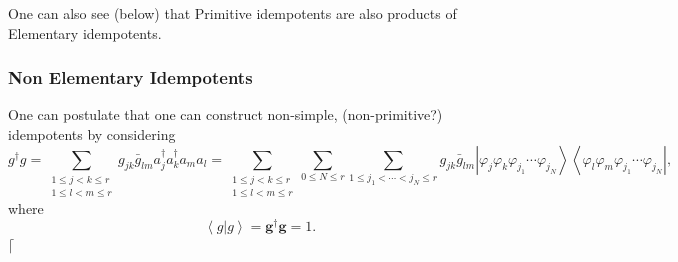 \documentclass[aps,preprint]{revtex4}%
\begin{document}
One can also see (below) that Primitive idempotents are also products of
Elementary idempotents.

\subsubsection{Non Elementary Idempotents }

One can postulate that one can construct non-simple, (non-primitive?)
idempotents by considering
\begin{equation}
g^{\dagger}g=\sum_{\substack{1\leq j<k\leq r\\1\leq l<m\leq r}}g_{jk}\bar
{g}_{lm}a_{j}^{\dagger}a_{k}^{\dagger}a_{m}a_{l}=\sum_{\substack{1\leq j<k\leq
r\\1\leq l<m\leq r}}\sum_{0\leq N\leq r}\sum_{1\leq j_{1}<\cdots<j_{N}\leq
r}g_{jk}\bar{g}_{lm}\left\vert \varphi_{j}\varphi_{k}\varphi_{j_{1}}%
\cdots\varphi_{j_{N}}\right\rangle \left\langle \varphi_{l}\varphi_{m}%
\varphi_{j_{1}}\cdots\varphi_{j_{N}}\right\vert ,
\end{equation}
where
\begin{equation}
\left\langle \left.  g\right\vert g\right\rangle =\mathbf{g}^{\dagger
}\mathbf{g}=1.
\end{equation}
$\lceil$%
\end{document}

